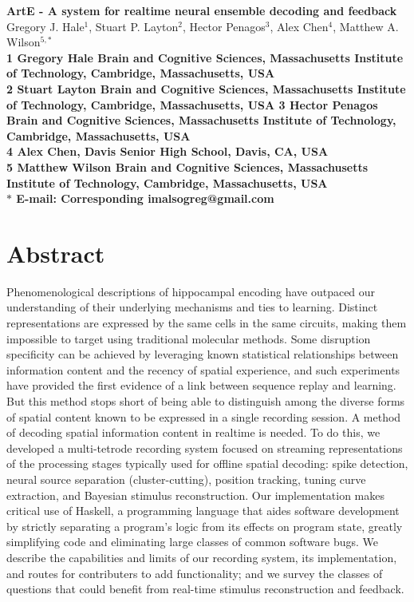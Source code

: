 \documentclass[10pt]{article}
\date{}
\begin{document}
\begin{flushleft}
{\Large
\textbf{ArtE - A system for realtime neural ensemble decoding and feedback}
}
\\
Gregory J. Hale$^{1}$, 
Stuart P. Layton$^{2}$, 
Hector Penagos$^{3}$, 
Alex Chen$^{4}$,
Matthew A. Wilson$^{5,\ast}$
\\
\bf{1} Gregory Hale Brain and Cognitive Sciences, Massachusetts Institute of Technology, Cambridge, Massachusetts, USA
\\
\bf{2} Stuart Layton Brain and Cognitive Sciences, Massachusetts Institute of Technology, Cambridge, Massachusetts, USA
\bf{3} Hector Penagos Brain and Cognitive Sciences, Massachusetts Institute of Technology, Cambridge, Massachusetts, USA
\\
\bf{4} Alex Chen, Davis Senior High School, Davis, CA, USA
\\
\bf{5} Matthew Wilson Brain and Cognitive Sciences, Massachusetts Institute of Technology, Cambridge, Massachusetts, USA
\\
$\ast$ E-mail: Corresponding imalsogreg@gmail.com
\end{flushleft}

\section*{Abstract}
Phenomenological descriptions of hippocampal encoding have outpaced our understanding of their underlying mechanisms and ties to learning. Distinct representations are expressed by the same cells in the same circuits, making them impossible to target using traditional molecular methods.  Some disruption specificity can be achieved by leveraging known statistical relationships between information content and the recency of spatial experience, and such experiments have provided the first evidence of a link between sequence replay and learning.  But this method stops short of being able to distinguish among the diverse forms of spatial content known to be expressed in a single recording session.
A method of decoding spatial information content in realtime is needed. To do this, we developed a multi-tetrode recording system focused on streaming representations of the processing stages typically used for offline spatial decoding: spike detection, neural source separation (cluster-cutting), position tracking, tuning curve extraction, and Bayesian stimulus reconstruction.  Our implementation makes critical use of Haskell, a programming language that aides software development by strictly separating a program's logic from its effects on program state, greatly simplifying code and eliminating large classes of common software bugs.  We describe the capabilities and limits of our recording system, its implementation, and routes for contributers to add functionality; and we survey the classes of questions that could benefit from real-time stimulus reconstruction and feedback.
\end{document}
